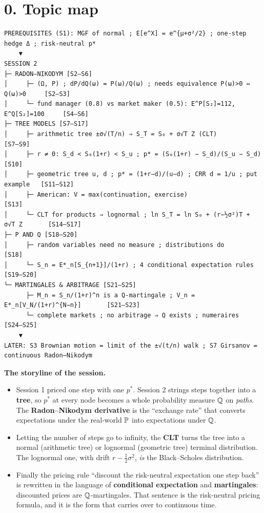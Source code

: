 \documentclass[10pt]{article}
\begin{document}
\section*{0. Topic map}
\begin{lstlisting}
PREREQUISITES (S1): MGF of normal ; E[e^X] = e^{μ+σ²/2} ; one-step hedge Δ ; risk-neutral p*
    ▼
SESSION 2
├─ RADON–NIKODYM [S2–S6]
│     ├─ (Ω, P) ; dP/dQ(ω) = P(ω)/Q(ω) ; needs equivalence P(ω)>0 ⇔ Q(ω)>0     [S2–S3]
│     └─ fund manager (0.8) vs market maker (0.5): E^P[S₂]=112, E^Q[S₂]=100     [S4–S6]
├─ TREE MODELS [S7–S17]
│     ├─ arithmetic tree ±σ√(T/n) ⇒ S_T = S₀ + σ√T Z (CLT)                       [S7–S9]
│     ├─ r ≠ 0: S_d < S₀(1+r) < S_u ; p* = (S₀(1+r) − S_d)/(S_u − S_d)           [S10]
│     ├─ geometric tree u, d ; p* = (1+r−d)/(u−d) ; CRR d = 1/u ; put example   [S11–S12]
│     ├─ American: V = max(continuation, exercise)                              [S13]
│     └─ CLT for products ⇒ lognormal ; ln S_T = ln S₀ + (r−½σ²)T + σ√T Z       [S14–S17]
├─ P AND Q [S18–S20]
│     ├─ random variables need no measure ; distributions do                    [S18]
│     └─ S_n = E*_n[S_{n+1}]/(1+r) ; 4 conditional expectation rules            [S19–S20]
└─ MARTINGALES & ARBITRAGE [S21–S25]
      ├─ M_n = S_n/(1+r)^n is a Q-martingale ; V_n = E*_n[V_N/(1+r)^{N−n}]       [S21–S23]
      └─ complete markets ; no arbitrage ⇒ Q exists ; numeraires                [S24–S25]
    ▼
LATER: S3 Brownian motion = limit of the ±√(t/n) walk ; S7 Girsanov = continuous Radon–Nikodym
\end{lstlisting}
\textbf{The storyline of the session.}
\begin{itemize}
\item Session 1 priced one step with one $p^*$. Session 2 strings steps together into a \textbf{tree}, so $p^*$ at every node becomes a whole probability measure $\mathbb{Q}$ on \emph{paths}. The \textbf{Radon--Nikodym derivative} is the ``exchange rate'' that converts expectations under the real-world $\mathbb{P}$ into expectations under $\mathbb{Q}$.
\item Letting the number of steps go to infinity, the \textbf{CLT} turns the tree into a normal (arithmetic tree) or lognormal (geometric tree) terminal distribution. The lognormal one, with drift $r-\frac12\sigma^2$, \emph{is} the Black--Scholes distribution.
\item Finally the pricing rule ``discount the risk-neutral expectation one step back'' is rewritten in the language of \textbf{conditional expectation} and \textbf{martingales}: discounted prices are $\mathbb{Q}$-martingales. That sentence is the risk-neutral pricing formula, and it is the form that carries over to continuous time.
\end{itemize}
\end{document}
